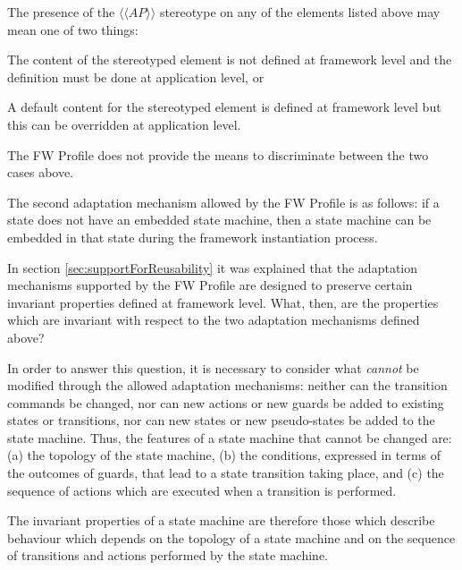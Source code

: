 \documentclass[a4paper,10pt]{article}
\newenvironment{fw_enumerate}					%
{\begin{enumerate}
  \setlength{\itemsep}{1mm}
  \setlength{\parskip}{0pt}
  \setlength{\parsep}{0pt}}
{\end{enumerate}}
\begin{document}
The presence of the $\langle\langle AP \rangle\rangle$ stereotype on any of the elements listed above may mean one of
two things:

\begin{fw_enumerate} 
\item The content of the stereotyped element is not defined at framework level and the
definition must be done at application level, or
\item A default content for the stereotyped element is defined at framework level but this
can be overridden at application level.
\end{fw_enumerate}

The FW Profile does not provide the means to discriminate between the two cases above.

The second adaptation mechanism allowed by the FW Profile is as follows: if a state does not
have an embedded state machine, then a state machine can be embedded in that state during
the framework instantiation process.

In section \ref{sec:supportForReusability} it was explained that the adaptation mechanisms supported by the FW Profile are
designed to preserve certain invariant properties defined at framework level. What, then, are
the properties which are invariant with respect to the two adaptation mechanisms defined
above?

In order to answer this question, it is necessary to consider what \emph{cannot} be modified through
the allowed adaptation mechanisms: neither can the transition commands be changed, nor can
new actions or new guards be added to existing states or transitions, nor can new states or new
pseudo-states be added to the state machine. Thus, the features of a state machine that cannot
be changed are: (a) the topology of the state machine, (b) the conditions, expressed in terms of
the outcomes of guards, that lead to a state transition taking place, and (c) the sequence of
actions which are executed when a transition is performed.

The invariant properties of a state machine are therefore those which describe behaviour which
depends on the topology of a state machine and on the sequence of transitions and actions
performed by the state machine.
\end{document}
